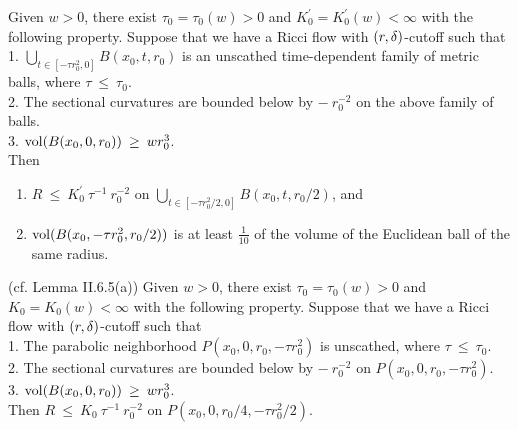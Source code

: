 \begin{lemma}
  \label{lem:kl-earlier-scalar-curvature-bounds-smaller-balls-from-lower-curvature-bound-estimates-scalar-curvature}
 \label{I.11.6(a)}
Given $w > 0$, there exist $\tau_0 = \tau_0(w) > 0$ and
$K_0^\prime = K_0^\prime(w) < \infty$
with the following property. Suppose that we have
a Ricci flow with $(r,\delta)$-cutoff such that \\
1. $\bigcup_{t \in
[-\tau r_0^2, 0]} B(x_0, t, r_0)$ is an unscathed time-dependent family of
metric balls, where $\tau \: \le \: \tau_0$. \\
2. The sectional curvatures are bounded below by $- \: r_0^{-2}$
on the
above family of balls. \\
3. $\operatorname{vol}(B(x_0, 0, r_0)) \: \ge \: w r_0^3$. \\

Then
\begin{enumerate}
\item
$R \: \le \: K_0^\prime \: \tau^{-1} \: r_0^{-2}$
on $\bigcup_{ t \in [- \tau r_0^2/2, 0]} B(x_0, t, r_0/2)$, and
\item $\operatorname{vol}(B(x_0, -\tau r_0^2, r_0/2))$ is at least $\frac{1}{10}$
of the volume of the Euclidean ball of the same radius.
\end{enumerate}
\end{lemma}

\begin{lemma}
  \label{lem:kl-earlier-scalar-curvature-bounds-smaller-balls-from-lower-curvature-bound-estimates-scalar-curvature-4}
 \label{II.6.5(a)}
(cf. Lemma II.6.5(a))
Given $w > 0$, there exist $\tau_0 = \tau_0(w) > 0$ and $K_0 =
K_0(w) < \infty$ with the following property. Suppose that we have
a Ricci flow with $(r,\delta)$-cutoff such that \\
1. The parabolic neighborhood
$P(x_0, 0, r_0, -\tau r_0^2)$ is unscathed,
where $\tau \: \le \: \tau_0$. \\
2. The sectional curvatures are bounded below by $- \: r_0^{-2}$ on
$P(x_0, 0, r_0, -\tau r_0^2)$. \\
3. $\operatorname{vol}(B(x_0, 0, r_0)) \: \ge \: wr_0^3$. \\

Then $R \: \le \: K_0 \: \tau^{-1} \: r_0^{-2}$ on
$P(x_0, 0, r_0/4, -\tau r_0^2/2)$.
\end{lemma}

